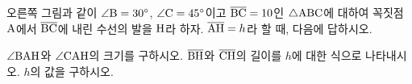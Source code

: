 \noindent\begin{minipage}[t]{0.58\linewidth}\vspace{0pt}\raggedright 오른쪽 그림과 같이 $\angle\mathrm{B}=30^\circ$, $\angle\mathrm{C}=45^\circ$이고 $\overline{\mathrm{BC}}=10$인 $\triangle\mathrm{ABC}$에 대하여 꼭짓점~$\mathrm{A}$에서 $\overline{\mathrm{BC}}$에 내린 수선의 발을 $\mathrm{H}$라 하자. $\overline{\mathrm{AH}}=h$라 할 때, 다음에 답하시오.\end{minipage}\hfill\begin{minipage}[t]{0.4\linewidth}\vspace{0pt}\centering \resizebox{\ifdim\width>\linewidth\linewidth\else\width\fi}{!}{}\end{minipage}\par
{} $\angle\mathrm{BAH}$와 $\angle\mathrm{CAH}$의 크기를 구하시오.
 $\overline{\mathrm{BH}}$와 $\overline{\mathrm{CH}}$의 길이를 $h$에 대한 식으로 나타내시오.
 $h$의 값을 구하시오.
